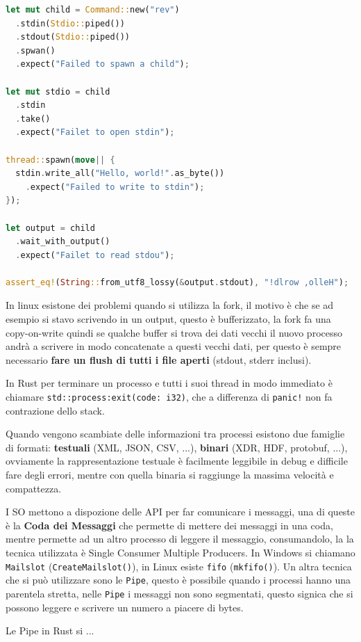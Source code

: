 \documentclass[12pt]{article}
\begin{document}
\begin{lstlisting}[language=rust]
let mut child = Command::new("rev")
  .stdin(Stdio::piped())
  .stdout(Stdio::piped())
  .spwan()
  .expect("Failed to spawn a child");

let mut stdio = child
  .stdin
  .take()
  .expect("Failet to open stdin");

thread::spawn(move|| {
  stdin.write_all("Hello, world!".as_byte())
    .expect("Failed to write to stdin");
});

let output = child
  .wait_with_output()
  .expect("Failet to read stdou");

assert_eq!(String::from_utf8_lossy(&output.stdout), "!dlrow ,olleH");
\end{lstlisting}
In linux esistone dei problemi quando si utilizza la fork, il motivo \`e che se ad esempio si stavo scrivendo in un output, questo \`e bufferizzato, la fork fa una copy-on-write quindi se qualche buffer si trova dei dati vecchi il nuovo processo andr\`a a scrivere in modo concatenate a questi vecchi dati, per questo \`e sempre necessario \textbf{fare un flush di tutti i file aperti} (stdout, stderr inclusi).

In Rust per terminare un processo e tutti i suoi thread in modo immediato \`e chiamare \texttt{std::process:exit(code: i32)}, che a differenza di \texttt{panic!} non fa contrazione dello stack.

Quando vengono scambiate delle informazioni tra processi esistono due famiglie di formati: \textbf{testuali} (XML, JSON, CSV, ...), \textbf{binari} (XDR, HDF, protobuf, ...), ovviamente la rappresentazione testuale \`e facilmente leggibile in debug e difficile fare degli errori, mentre con quella binaria si raggiunge la massima velocit\`a e compattezza.

I SO mettono a dispozione delle API per far comunicare i messaggi, una di queste \`e la \textbf{Coda dei Messaggi} che permette di mettere dei messaggi in una coda, mentre permette ad un altro processo di leggere il messaggio, consumandolo, la la tecnica utilizzata \`e Single Consumer Multiple Producers. In Windows si chiamano \texttt{Mailslot} (\texttt{CreateMailslot()}), in Linux esiste \texttt{fifo} (\texttt{mkfifo()}). Un altra tecnica che si pu\`o utilizzare sono le \texttt{Pipe}, questo \`e possibile quando i processi hanno una parentela stretta, nelle \texttt{Pipe} i messaggi non sono segmentati, questo signica che si possono leggere e scrivere un numero a piacere di bytes.

Le Pipe in Rust si ...
\end{document}
